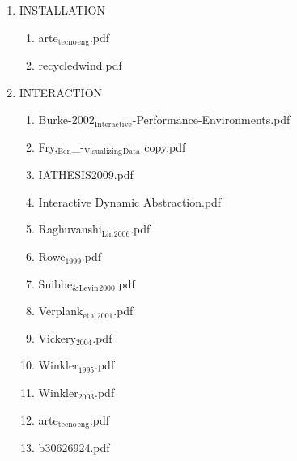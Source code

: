 \documentclass[11pt]{article}
\begin{document}
\begin{enumerate}
\begin{enumerate}
\begin{enumerate}
\begin{enumerate}
\item INSTALLATION
\label{sec-1-1-1-1-7-3-32}
\begin{enumerate}
\item arte$_{\text{tecno}}$$_{\text{eng}}$.pdf
\label{sec-1-1-1-1-7-3-32-1}

\item recycledwind.pdf
\label{sec-1-1-1-1-7-3-32-2}
\end{enumerate}

\item INTERACTION
\label{sec-1-1-1-1-7-3-33}
\begin{enumerate}
\item Burke-2002$_{\text{Interactive}}$-Performance-Environments.pdf
\label{sec-1-1-1-1-7-3-33-1}

\item Fry,$_{\text{Ben}}$\_-$_{\text{Visualizing}}$$_{\text{Data}}$ copy.pdf
\label{sec-1-1-1-1-7-3-33-2}

\item IATHESIS2009.pdf
\label{sec-1-1-1-1-7-3-33-3}

\item Interactive Dynamic Abstraction.pdf
\label{sec-1-1-1-1-7-3-33-4}

\item Raghuvanshi$_{\text{Lin}}$$_{\text{2006}}$.pdf
\label{sec-1-1-1-1-7-3-33-5}

\item Rowe$_{\text{1999}}$.pdf
\label{sec-1-1-1-1-7-3-33-6}

\item Snibbe$_{\text{\&}}$$_{\text{Levin}}$$_{\text{2000}}$.pdf
\label{sec-1-1-1-1-7-3-33-7}

\item Verplank$_{\text{et}}$$_{\text{al}}$$_{\text{2001}}$.pdf
\label{sec-1-1-1-1-7-3-33-8}

\item Vickery$_{\text{2004}}$.pdf
\label{sec-1-1-1-1-7-3-33-9}

\item Winkler$_{\text{1995}}$.pdf
\label{sec-1-1-1-1-7-3-33-10}

\item Winkler$_{\text{2003}}$.pdf
\label{sec-1-1-1-1-7-3-33-11}

\item arte$_{\text{tecno}}$$_{\text{eng}}$.pdf
\label{sec-1-1-1-1-7-3-33-12}

\item b30626924.pdf
\label{sec-1-1-1-1-7-3-33-13}


\end{enumerate}
\end{enumerate}
\end{enumerate}
\end{enumerate}
\end{enumerate}
\end{document}
